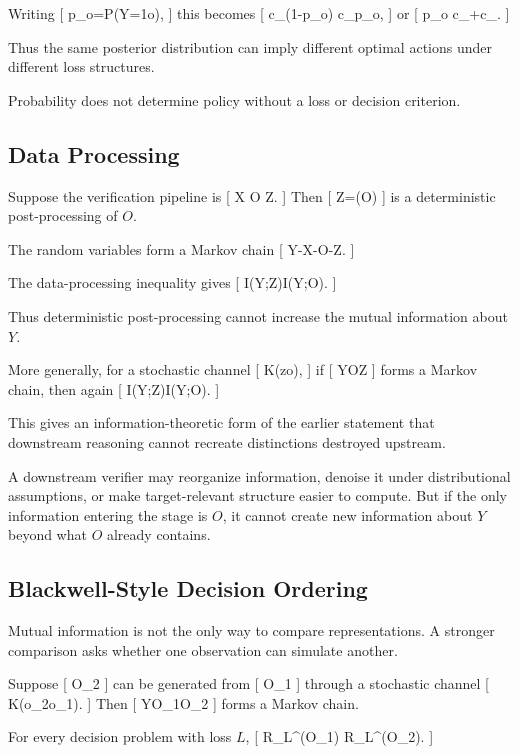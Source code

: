 \documentclass[11pt]{article}
\begin{document}
Writing
[
p_o=P(Y=1\mid o),
]
this becomes
[
c_{}(1-p_o)
\leq
c_{}p_o,
]
or
[
p_o
\geq
{}
{c_{}+c_{}}.
]

Thus the same posterior distribution can imply different optimal actions under different loss structures.

Probability does not determine policy without a loss or decision criterion.

\subsection{Data Processing}

Suppose the verification pipeline is
[
X
\xrightarrow{\pi}
O
\xrightarrow{\rho}
Z.
]
Then
[
Z=\rho(O)
]
is a deterministic post-processing of $O$.

The random variables form a Markov chain
[
Y-X-O-Z.
]

The data-processing inequality gives
[
I(Y;Z)\leq I(Y;O).
]

Thus deterministic post-processing cannot increase the mutual information about $Y$.

More generally, for a stochastic channel
[
K(z\mid o),
]
if
[
Y\to O\to Z
]
forms a Markov chain, then again
[
I(Y;Z)\leq I(Y;O).
]

This gives an information-theoretic form of the earlier statement that downstream reasoning cannot recreate distinctions destroyed upstream.

A downstream verifier may reorganize information, denoise it under distributional assumptions, or make target-relevant structure easier to compute. But if the only information entering the stage is $O$, it cannot create new information about $Y$ beyond what $O$ already contains.

\subsection{Blackwell-Style Decision Ordering}

Mutual information is not the only way to compare representations. A stronger comparison asks whether one observation can simulate another.

Suppose
[
O_2
]
can be generated from
[
O_1
]
through a stochastic channel
[
K(o_2\mid o_1).
]
Then
[
Y\to O_1\to O_2
]
forms a Markov chain.

For every decision problem with loss $L$,
[
R_L^\star(O_1)
\leq
R_L^\star(O_2).
]
\end{document}
